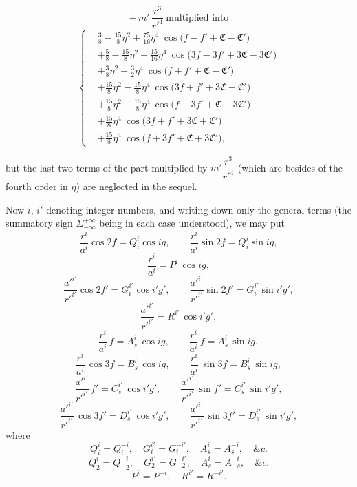 \documentclass[11pt]{article}
\begin{document}
\[
+\,m'\,\frac{r^{3}}{r'^{4}}\ \text{multiplied into}
\]
\[
\left\{
\begin{aligned}
&\tfrac{3}{8}-\tfrac{15}{8}\eta^{2}+\tfrac{75}{16}\eta^{4}\ \cos\bigl(f-f'+\mathfrak{C}-\mathfrak{C}'\bigr)\\
&+\tfrac{5}{8}-\tfrac{15}{8}\eta^{2}+\tfrac{15}{16}\eta^{4}\ \cos\bigl(3f-3f'+3\mathfrak{C}-3\mathfrak{C}'\bigr)\\
&+\tfrac{3}{8}\eta^{2}-\tfrac{3}{2}\eta^{4}\ \cos\bigl(f+f'+\mathfrak{C}-\mathfrak{C}'\bigr)\\
&+\tfrac{15}{8}\eta^{2}-\tfrac{15}{8}\eta^{4}\ \cos\bigl(3f+f'+3\mathfrak{C}-\mathfrak{C}'\bigr)\\
&+\tfrac{15}{8}\eta^{2}-\tfrac{15}{8}\eta^{4}\ \cos\bigl(f-3f'+\mathfrak{C}-3\mathfrak{C}'\bigr)\\
&+\tfrac{15}{8}\eta^{4}\ \cos\bigl(3f+f'+3\mathfrak{C}+\mathfrak{C}'\bigr)\\
&+\tfrac{15}{8}\eta^{4}\ \cos\bigl(f+3f'+\mathfrak{C}+3\mathfrak{C}'\bigr),
\end{aligned}
\right.
\]

\bigskip
{} but the last two terms of the part multiplied by $m'\dfrac{r^{3}}{r'^{4}}$ (which are besides of the fourth order in $\eta$) are neglected in the sequel.

\medskip
\noindent Now $i$, $i'$ denoting integer numbers, and writing down only the general terms (the summatory sign $\Sigma_{-\infty}^{+\infty}$ being in each case understood), we may put
\[
\frac{r^{i}}{a^{i}}\cos 2f = Q_{i}^{i}\cos ig,\qquad \frac{r^{i}}{a^{i}}\sin 2f = Q_{i}^{i}\sin ig,
\]
\[
\frac{r^{i}}{a^{i}} = P^{i}\,\cos ig,
\]
\[
\frac{a'^{i'}}{r'^{i'}}\cos 2f' = G_{i}^{i'}\cos i'g',\qquad \frac{a'^{i'}}{r'^{i'}}\sin 2f' = G_{i}^{i'}\sin i'g',
\]
\[
\frac{a'^{i'}}{r'^{i'}} = R^{i'}\,\cos i'g',
\]
\[
\frac{r^{i}}{a^{i}}\,f = A_{s}^{i}\,\cos ig,\qquad \frac{r^{i}}{a^{i}}\,f = A_{s}^{i}\,\sin ig,
\]
\[
\frac{r^{i}}{a^{i}}\,\cos 3f = B_{s}^{i}\,\cos ig,\qquad \frac{r^{i}}{a^{i}}\,\sin 3f = B_{s}^{i}\,\sin ig,
\]
\[
\frac{a'^{i'}}{r'^{i'}}\,f' = C_{s}^{i'}\,\cos i'g',\qquad \frac{a'^{i'}}{r'^{i'}}\,\sin f' = C_{s}^{i'}\,\sin i'g',
\]
\[
\frac{a'^{i'}}{r'^{i'}}\,\cos 3f' = D_{s}^{i'}\,\cos i'g',\qquad \frac{a'^{i'}}{r'^{i'}}\,\sin 3f' = D_{s}^{i'}\,\sin i'g',
\]
where
\[
Q_{i}^{i} = Q_{i}^{-i},\quad G_{i}^{i'} = G_{i}^{-i'},\quad A_{s}^{i} = A_{s}^{-i},\quad \&c.
\]
\[
Q_{2}^{i} = Q_{-2}^{-i},\quad G_{2}^{i'} = G_{-2}^{-i'},\quad A_{s}^{i} = A_{-s}^{-i},\quad \&c.
\]
\[
P^{i} = P^{-i},\quad R^{i'} = R^{-i'}.
\]
\end{document}
